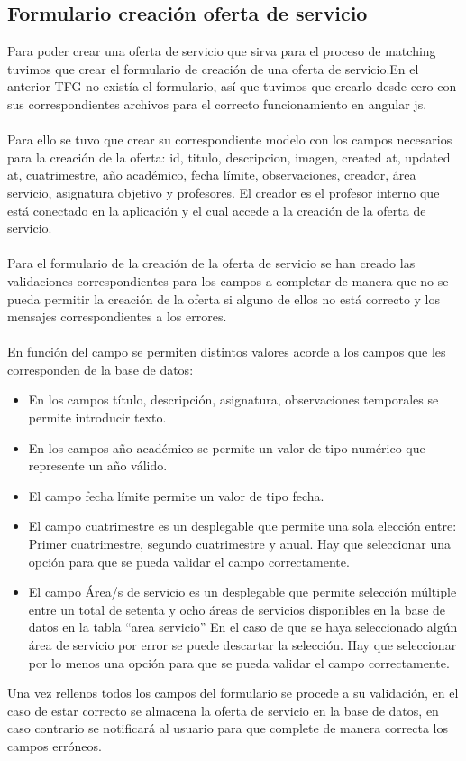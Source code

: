 \documentclass[11pt]{article}
\begin{document}
\subsection{Formulario creación oferta de servicio}
Para poder crear una oferta de servicio que sirva para el proceso de matching tuvimos que crear el formulario de creación de una oferta de servicio.En el anterior TFG no existía el formulario, así que tuvimos que crearlo desde cero con sus correspondientes archivos para el correcto funcionamiento en angular js.\\\\
Para ello se tuvo que crear su correspondiente modelo con los campos necesarios para la creación de la oferta: id, titulo, descripcion, imagen, created at, updated at, cuatrimestre, año académico, fecha límite, observaciones, creador, área servicio, asignatura objetivo y profesores. El creador es el profesor interno que está conectado en la aplicación y el cual accede a la creación de la oferta de servicio.\\\\
Para el formulario de la creación de la oferta de servicio se han creado las validaciones correspondientes para los campos a completar de manera que no se pueda permitir la creación de la oferta si alguno de ellos no está correcto y los mensajes correspondientes a los errores. \\\\
En función del campo se permiten distintos valores acorde a los campos que les corresponden de la base de datos: \\
\begin{itemize} 
	\item En los campos título, descripción, asignatura, observaciones temporales se permite introducir texto.
	\item En los campos año académico se permite un valor de tipo numérico que represente un año válido.
	\item El campo fecha límite permite un valor de tipo fecha. 
	\item  El campo cuatrimestre es un desplegable que permite una sola elección entre: Primer cuatrimestre, segundo cuatrimestre y anual. Hay que seleccionar una opción para que se pueda validar el campo correctamente.
	\item El campo Área/s de servicio es un desplegable que permite selección múltiple entre un total de setenta y ocho áreas de servicios disponibles en la base de datos en la tabla “area servicio” En el caso de que se haya seleccionado algún área de servicio por error se puede descartar la selección. Hay que seleccionar por lo menos una opción para que se pueda validar el campo correctamente.
\end{itemize}
Una vez rellenos todos los campos del formulario se procede a su validación, en el caso de estar correcto se almacena la oferta de servicio en la base de datos, en caso contrario se notificará al usuario para que complete de manera correcta los campos erróneos.
\end{document}
